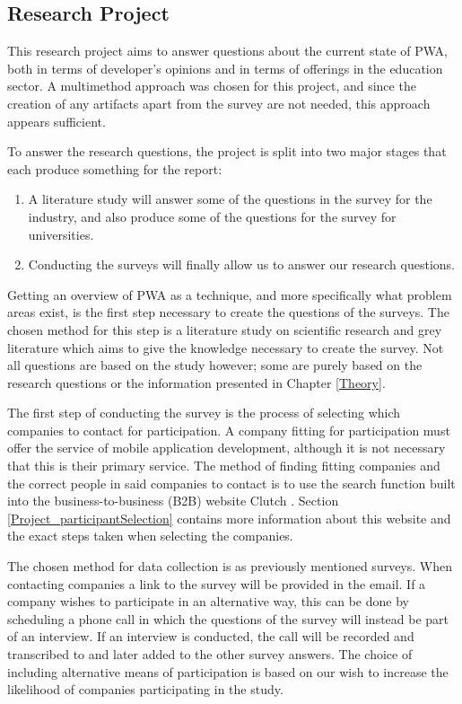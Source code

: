 \documentclass[a4paper,12pt]{article}
\begin{document}
\subsection{Research Project}
\label{Method_project}
This research project aims to answer questions about the current state of PWA, both in terms of developer’s opinions and in terms of offerings in the education sector. A multimethod approach was chosen for this project, and since the creation of any artifacts apart from the survey are not needed, this approach appears sufficient.

To answer the research questions, the project is split into two major stages that each produce something for the report:

\begin{enumerate}
    \item A literature study will answer some of the questions in the survey for the industry, and also produce some of the questions for the survey for universities.
    \item Conducting the surveys will finally allow us to answer our research questions.
\end{enumerate}

Getting an overview of PWA as a technique, and more specifically what problem areas exist, is the first step necessary to create the questions of the surveys. The chosen method for this step is a literature study on scientific research and grey literature which aims to give the knowledge necessary to create the survey. Not all questions are based on the study however; some are purely based on the research questions or the information presented in Chapter \ref{Theory}.

The first step of conducting the survey is the process of selecting which companies to contact for participation. A company fitting for participation must offer the service of mobile application development, although it is not necessary that this is their primary service. The method of finding fitting companies and the correct people in said companies to contact is to use the search function built into the business-to-business (B2B) website Clutch \cite{clutch}. Section \ref{Project_participantSelection} contains more information about this website and the exact steps taken when selecting the companies.

The chosen method for data collection is as previously mentioned surveys. When contacting companies a link to the survey will be provided in the email. If a company wishes to participate in an alternative way, this can be done by scheduling a phone call in which the questions of the survey will instead be part of an interview. If an interview is conducted, the call will be recorded and transcribed to and later added to the other survey answers. The choice of including alternative means of participation is based on our wish to increase the likelihood of companies participating in the study.
\end{document}

